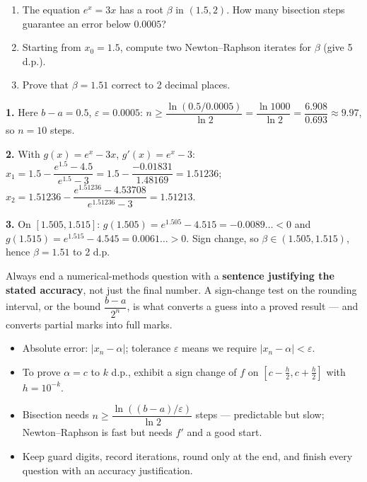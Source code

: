 \documentclass[11pt]{article}
\begin{document}
\begin{exercice}
\begin{enumerate}
\item The equation $e^x = 3x$ has a root $\beta$ in $(1.5, 2)$. How many bisection steps guarantee an error below $0.0005$?
\item Starting from $x_0 = 1.5$, compute two Newton--Raphson iterates for $\beta$ (give 5 d.p.).
\item Prove that $\beta = 1.51$ correct to 2 decimal places.
\end{enumerate}
\end{exercice}

\begin{corrige}[Exercise 1]
\textbf{1.} Here $b - a = 0.5$, $\varepsilon = 0.0005$:
$n \ge \dfrac{\ln(0.5/0.0005)}{\ln 2} = \dfrac{\ln 1000}{\ln 2} = \dfrac{6.908}{0.693} \approx 9.97$, so $n = 10$ steps.

\textbf{2.} With $g(x) = e^x - 3x$, $g'(x) = e^x - 3$:
$x_1 = 1.5 - \dfrac{e^{1.5} - 4.5}{e^{1.5} - 3} = 1.5 - \dfrac{-0.01831}{1.48169} = 1.51236$;
$x_2 = 1.51236 - \dfrac{e^{1.51236} - 4.53708}{e^{1.51236} - 3} = 1.51213$.

\textbf{3.} On $[1.505, 1.515]$: $g(1.505) = e^{1.505} - 4.515 = -0.0089\ldots < 0$ and $g(1.515) = e^{1.515} - 4.545 = 0.0061\ldots > 0$. Sign change, so $\beta \in (1.505, 1.515)$, hence $\beta = 1.51$ to 2 d.p.
\end{corrige}

\begin{attention}
Always end a numerical-methods question with a \textbf{sentence justifying the stated accuracy}, not just the final number. A sign-change test on the rounding interval, or the bound $\dfrac{b-a}{2^n}$, is what converts a guess into a proved result — and converts partial marks into full marks.
\end{attention}

\begin{aretenir}
\begin{itemize}
\item Absolute error: $|x_n - \alpha|$; tolerance $\varepsilon$ means we require $|x_n - \alpha| < \varepsilon$.
\item To prove $\alpha = c$ to $k$ d.p., exhibit a sign change of $f$ on $\left[c - \tfrac{h}{2}, c + \tfrac{h}{2}\right]$ with $h = 10^{-k}$.
\item Bisection needs $n \ge \dfrac{\ln((b-a)/\varepsilon)}{\ln 2}$ steps — predictable but slow; Newton--Raphson is fast but needs $f'$ and a good start.
\item Keep guard digits, record iterations, round only at the end, and finish every question with an accuracy justification.
\end{itemize}
\end{aretenir}
\end{document}
